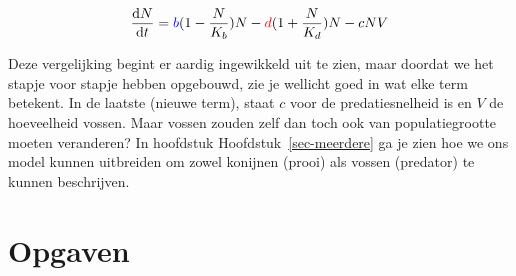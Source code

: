 \documentclass[
  a4paper,
]{scrbook}
\theoremstyle{definition}
\theoremstyle{remark}
\begin{document}
\begin{align}
    \frac{\mathrm{d}N}{\mathrm{d}t} &= \color{blue}b\color{black}(1-\frac{N}{K_b})N - \color{red}d\color{black}(1+\frac{N}{K_d})N - cNV\\
\end{align}

Deze vergelijking begint er aardig ingewikkeld uit te zien, maar doordat
we het stapje voor stapje hebben opgebouwd, zie je wellicht goed in wat
elke term betekent. In de laatste (nieuwe term), staat \(c\) voor de
predatiesnelheid is en \(V\) de hoeveelheid vossen. Maar vossen zouden
zelf dan toch ook van populatiegrootte moeten veranderen? In hoofdstuk
Hoofdstuk~\ref{sec-meerdere} ga je zien hoe we ons model kunnen
uitbreiden om zowel konijnen (prooi) als vossen (predator) te kunnen
beschrijven.

\hypertarget{opgaven-2}{%
\section{Opgaven}\label{opgaven-2}}
\end{document}
